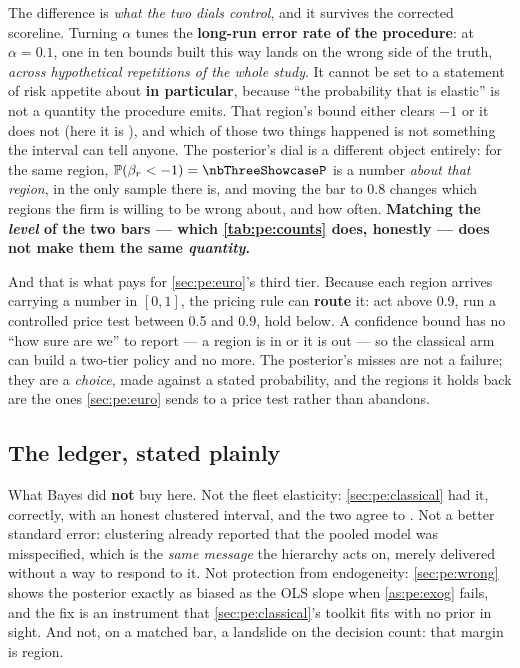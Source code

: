 The difference is \emph{what the two dials control}, and it survives the corrected scoreline.
Turning $\alpha$ tunes the \textbf{long-run error rate of the procedure}: at $\alpha = 0.1$, one in
ten bounds built this way lands on the wrong side of the truth, \emph{across hypothetical
repetitions of the whole study}. It cannot be set to a statement of risk appetite about
\textbf{\nbThreeShowcaseRegion{} in particular}, because ``the probability that
\nbThreeShowcaseRegion{} is elastic'' is not a quantity the procedure emits.
That region's bound either clears $-1$ or it does not (here it is \nbThreeShowcaseBound), and which
of those two things happened is not something the interval can tell anyone. The posterior's dial is
a different object entirely: for the same region, $\Prob(\beta_r < -1) = \nbThreeShowcaseP$ is a
number \emph{about that region}, in the only sample there is, and moving the bar to 0.8 changes
which regions the firm is willing to be wrong about, and how often. \textbf{Matching the \emph{level} of the two bars ---
which \cref{tab:pe:counts} does, honestly --- does not make them the same \emph{quantity}.}

And that is what pays for \cref{sec:pe:euro}'s third tier. Because each region arrives carrying a
number in $[0,1]$, the pricing rule can \textbf{route} it: act above 0.9, run a controlled price
test between 0.5 and 0.9, hold below. A confidence bound has no ``how sure are we'' to report --- a
region is in or it is out --- so the classical arm can build a two-tier policy and no more. The
posterior's \nbThreeActPpMissed{} misses are not a failure; they are a \emph{choice}, made against
a stated probability, and the regions it holds back are the ones \cref{sec:pe:euro} sends to a
price test rather than abandons.

\subsection*{The ledger, stated plainly}

What Bayes did \textbf{not} buy here. Not the fleet elasticity: \cref{sec:pe:classical} had it,
correctly, with an honest clustered interval, and the two agree to \nbThreeMuVsOls. Not a better
standard error: clustering already reported that the pooled model was misspecified, which is the
\emph{same message} the hierarchy acts on, merely delivered without a way to respond to it. Not
protection from endogeneity: \cref{sec:pe:wrong} shows the posterior exactly as biased as the OLS
slope when \cref{as:pe:exog} fails, and the fix is an instrument that \cref{sec:pe:classical}'s
toolkit fits with no prior in sight. And not, on a matched bar, a landslide on the decision count:
that margin is \nbThreeGapHonest{} region.

